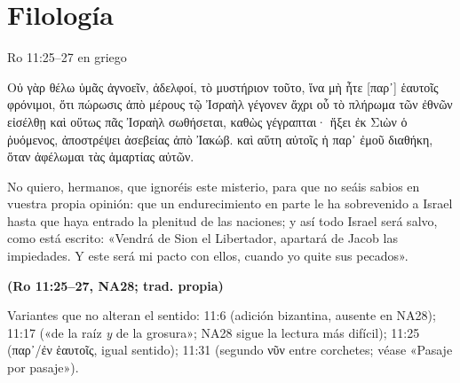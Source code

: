 \documentclass[hyperref={bookmarks=false},aspectratio=169]{beamer}
\newcommand{\grc}[1]{\foreignlanguage{ancientgreek}{#1}}
\newcommand{\fuente}[1]{\par\hfill{\upshape\bfseries\footnotesize\textcolor{ladrillo}{#1}}}
\begin{document}
\section{Filología}
\begin{frame}{Ro 11:25--27 en griego}
\begin{cita}[fontupper=\upshape\small]\grc{Οὐ γὰρ θέλω ὑμᾶς ἀγνοεῖν, ἀδελφοί, τὸ μυστήριον τοῦτο, ἵνα μὴ ἦτε [παρ᾿] ἑαυτοῖς φρόνιμοι, ὅτι πώρωσις ἀπὸ μέρους τῷ Ἰσραὴλ γέγονεν ἄχρι οὗ τὸ πλήρωμα τῶν ἐθνῶν εἰσέλθῃ καὶ οὕτως πᾶς Ἰσραὴλ σωθήσεται, καθὼς γέγραπται· ἥξει ἐκ Σιὼν ὁ ῥυόμενος, ἀποστρέψει ἀσεβείας ἀπὸ Ἰακώβ. καὶ αὕτη αὐτοῖς ἡ παρ᾿ ἐμοῦ διαθήκη, ὅταν ἀφέλωμαι τὰς ἁμαρτίας αὐτῶν.}\end{cita}
\begin{cita}[fontupper=\scriptsize\itshape]No quiero, hermanos, que ignoréis este misterio, para que no seáis sabios en vuestra propia opinión: que un endurecimiento en parte le ha sobrevenido a Israel hasta que haya entrado la plenitud de las naciones; y así todo Israel será salvo, como está escrito: «Vendrá de Sion el Libertador, apartará de Jacob las impiedades. Y este será mi pacto con ellos, cuando yo quite sus pecados».\fuente{(Ro 11:25--27, NA28; trad. propia)}\end{cita}
\begin{notalam}
Variantes que no alteran el sentido: 11:6 (adición bizantina, ausente en NA28); 11:17 («de la raíz \emph{y} de la grosura»; NA28 sigue la lectura más difícil); 11:25 (\grc{παρ᾿}/\grc{ἐν} \grc{ἑαυτοῖς}, igual sentido); 11:31 (segundo \grc{νῦν} entre corchetes; véase «Pasaje por pasaje»).
\end{notalam}
\end{frame}
\end{document}
